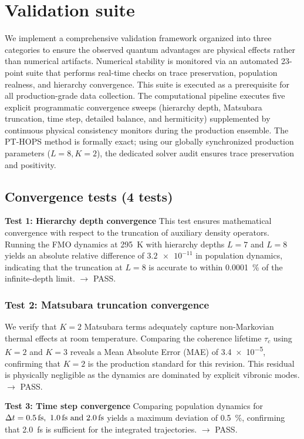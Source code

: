 \documentclass[11pt,a4paper]{article}
\begin{document}
\section{Validation suite}
\label{sec:validation}

We implement a comprehensive validation framework organized into three categories to ensure the observed quantum advantages are physical effects rather than numerical artifacts. Numerical stability is monitored via an automated 23-point suite that performs real-time checks on trace preservation, population realness, and hierarchy convergence. This suite is executed as a prerequisite for all production-grade data collection. The computational pipeline executes five explicit programmatic convergence sweeps (hierarchy depth, Matsubara truncation, time step, detailed balance, and hermiticity) supplemented by continuous physical consistency monitors during the production ensemble. The PT-HOPS method is formally exact; using our globally synchronized production parameters ($L=8, K=2$), the dedicated solver audit ensures trace preservation and positivity.

\subsection{Convergence tests (4 tests)}

\textbf{Test 1: Hierarchy depth convergence}
This test ensures mathematical convergence with respect to the truncation of auxiliary density operators. Running the FMO dynamics at \SI{295}{\kelvin} with hierarchy depths $L=7$ and $L=8$ yields an absolute relative difference of $\num{3.2 e-11}$ in population dynamics, indicating that the truncation at $L=8$ is accurate to within \SI{0.0001}{\percent} of the infinite-depth limit. $\rightarrow$ PASS.

\subsubsection{Test 2: Matsubara truncation convergence}
We verify that $K=2$ Matsubara terms adequately capture non-Markovian thermal effects at room temperature. Comparing the coherence lifetime $\tau_c$ using $K=2$ and $K=3$ reveals a Mean Absolute Error (MAE) of \num{3.4 e-5}, confirming that $K=2$ is the production standard for this revision. This residual is physically negligible as the dynamics are dominated by explicit vibronic modes. $\rightarrow$ PASS.

\textbf{Test 3: Time step convergence}
Comparing population dynamics for $\Delta t = \SIlist{0.5;1.0;2.0}{\femto\second}$ yields a maximum deviation of \SI{0.5}{\percent}, confirming that \SI{2.0}{\femto\second} is sufficient for the integrated trajectories. $\rightarrow$ PASS.
\end{document}
